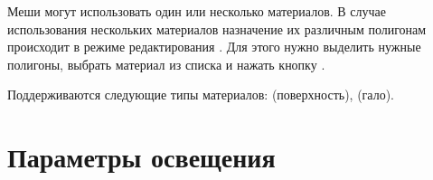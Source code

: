 \documentclass[a4paper,12pt,oneside]{sphinxmanual}
\begin{document}
Меши могут использовать один или несколько материалов. В случае использования нескольких материалов назначение их различным полигонам происходит в режиме редактирования . Для этого нужно выделить нужные полигоны, выбрать материал из списка и нажать кнопку .

Поддерживаются следующие типы материалов:  (поверхность),  (гало).


\section{Параметры освещения}
\label{materials:id2}\label{materials:index-1}\label{materials:material-lighting-params}\begin{figure}[htbp]
\centering

\end{figure}
\end{document}
